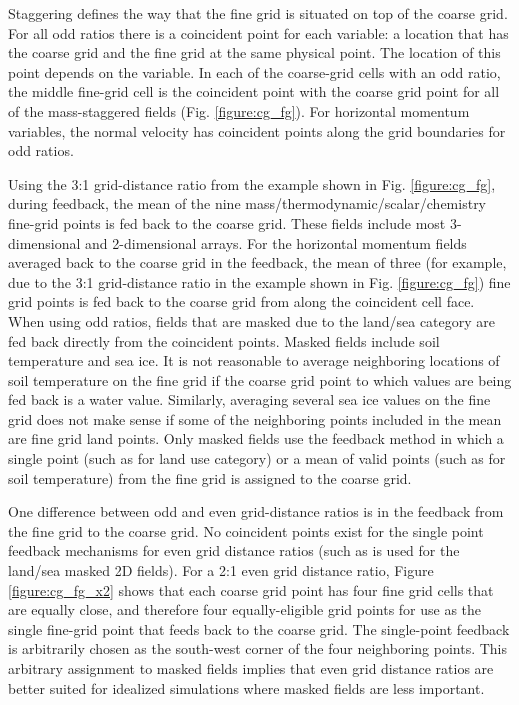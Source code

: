 Staggering defines the way that the fine grid is situated 
on top of the coarse grid.  For all odd ratios there is a coincident 
point for each variable: a location that has the coarse grid 
and the fine grid at the same physical point.  The location of 
this point depends on the variable. 
In each of the 
coarse-grid cells with an odd ratio, the middle fine-grid cell
is the coincident point with the coarse grid point for all of the 
mass-staggered fields (Fig. \ref{figure:cg_fg}).  
For horizontal momentum variables,
the normal velocity has coincident points along the grid boundaries for odd ratios.

Using the 3:1 grid-distance ratio
from the example shown in Fig. \ref{figure:cg_fg},
during feedback, the mean of the nine mass/thermodynamic/scalar/chemistry fine-grid 
points is fed back to the coarse grid.
These fields include most 3-dimensional and 2-dimensional arrays.  
For the horizontal momentum fields averaged back to the coarse grid in the 
feedback, the mean of three (for example, due to the 3:1 grid-distance ratio
in the example shown in Fig. \ref{figure:cg_fg}) fine grid
points is fed back to the coarse grid from along the coincident cell face.
When using odd ratios, fields that are masked due 
to the land/sea category are fed back directly from the coincident points.  
Masked fields include soil temperature and sea ice.  It is not reasonable 
to average neighboring locations of soil temperature on the fine grid 
if the coarse grid point to which values are being fed back is a water value.  Similarly, averaging
several sea ice values on the fine grid does not make sense if some of the neighboring
points included in the mean are fine grid land points. 
Only masked fields use the feedback method in which a single
point (such as for land use category) or a mean of valid points
(such as for soil temperature) from the fine grid is assigned to the coarse grid.

One difference between odd and even grid-distance ratios 
is in the feedback from the fine grid to the coarse grid.  No 
coincident points exist for the single point feedback mechanisms
for even grid distance ratios
(such as is used for the land/sea masked 2D fields).  
For a 2:1 even grid distance ratio, Figure
\ref{figure:cg_fg_x2} shows that each coarse 
grid point has four fine grid cells that are equally close,
and therefore four equally-eligible grid points for use as the 
single fine-grid point that feeds back to the coarse grid.  The 
single-point feedback is arbitrarily chosen as the south-west 
corner of the four neighboring points.
This arbitrary assignment to masked fields implies that even
grid distance ratios are better suited for idealized simulations
where masked fields are less important.



